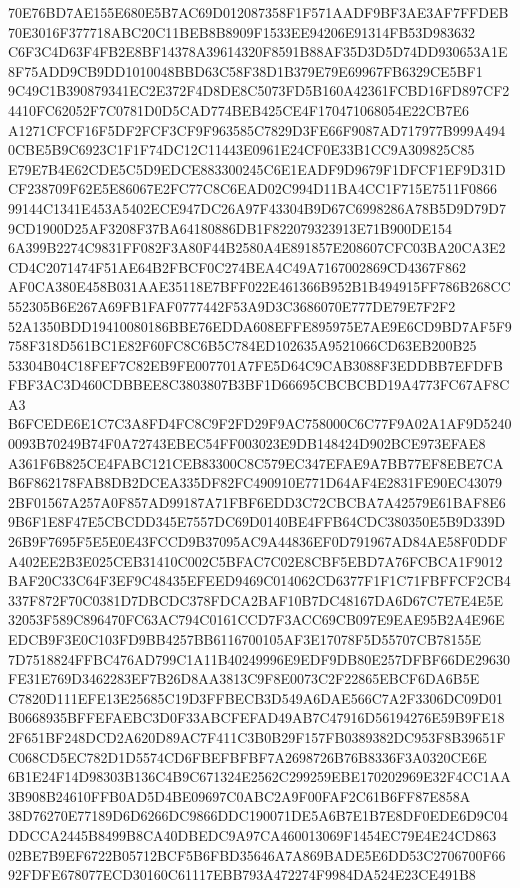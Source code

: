 \documentclass[UTF8,fontset=fandol,zihao=-4,a4paper]{ctexart}
\begin{document}
{{70E76BD7AE155E680E5B7AC69D012087358F1F571AADF9BF3AE3AF7FFDEB70E3016F377718ABC20C11BEB8B8909F1533EE94206E91314FB53D983632
C6F3C4D63F4FB2E8BF14378A39614320F8591B88AF35D3D5D74DD930653A1E8F75ADD9CB9DD1010048BBD63C58F38D1B379E79E69967FB6329CE5BF1
9C49C1B390879341EC2E372F4D8DE8C5073FD5B160A42361FCBD16FD897CF24410FC62052F7C0781D0D5CAD774BEB425CE4F170471068054E22CB7E6
A1271CFCF16F5DF2FCF3CF9F963585C7829D3FE66F9087AD717977B999A4940CBE5B9C6923C1F1F74DC12C11443E0961E24CF0E33B1CC9A309825C85
E79E7B4E62CDE5C5D9EDCE883300245C6E1EADF9D9679F1DFCF1EF9D31DCF238709F62E5E86067E2FC77C8C6EAD02C994D11BA4CC1F715E7511F0866
99144C1341E453A5402ECE947DC26A97F43304B9D67C6998286A78B5D9D79D79CD1900D25AF3208F37BA64180886DB1F822079323913E71B900DE154
6A399B2274C9831FF082F3A80F44B2580A4E891857E208607CFC03BA20CA3E2CD4C2071474F51AE64B2FBCF0C274BEA4C49A7167002869CD4367F862
AF0CA380E458B031AAE35118E7BFF022E461366B952B1B494915FF786B268CC552305B6E267A69FB1FAF0777442F53A9D3C3686070E777DE79E7F2F2
52A1350BDD19410080186BBE76EDDA608EFFE895975E7AE9E6CD9BD7AF5F9758F318D561BC1E82F60FC8C6B5C784ED102635A9521066CD63EB200B25
53304B04C18FEF7C82EB9FE007701A7FE5D64C9CAB3088F3EDDBB7EFDFBFBF3AC3D460CDBBEE8C3803807B3BF1D66695CBCBCBD19A4773FC67AF8CA3
B6FCEDE6E1C7C3A8FD4FC8C9F2FD29F9AC758000C6C77F9A02A1AF9D52400093B70249B74F0A72743EBEC54FF003023E9DB148424D902BCE973EFAE8
A361F6B825CE4FABC121CEB83300C8C579EC347EFAE9A7BB77EF8EBE7CAB6F862178FAB8DB2DCEA335DF82FC490910E771D64AF4E2831FE90EC43079
2BF01567A257A0F857AD99187A71FBF6EDD3C72CBCBA7A42579E61BAF8E69B6F1E8F47E5CBCDD345E7557DC69D0140BE4FFB64CDC380350E5B9D339D
26B9F7695F5E5E0E43FCCD9B37095AC9A44836EF0D791967AD84AE58F0DDFA402EE2B3E025CEB31410C002C5BFAC7C02E8CBF5EBD7A76FCBCA1F9012
BAF20C33C64F3EF9C48435EFEED9469C014062CD6377F1F1C71FBFFCF2CB4337F872F70C0381D7DBCDC378FDCA2BAF10B7DC48167DA6D67C7E7E4E5E
32053F589C896470FC63AC794C0161CCD7F3ACC69CB097E9EAE95B2A4E96EEDCB9F3E0C103FD9BB4257BB6116700105AF3E17078F5D55707CB78155E
7D7518824FFBC476AD799C1A11B40249996E9EDF9DB80E257DFBF66DE29630FE31E769D3462283EF7B26D8AA3813C9F8E0073C2F22865EBCF6DA6B5E
C7820D111EFE13E25685C19D3FFBECB3D549A6DAE566C7A2F3306DC09D01B0668935BFFEFAEBC3D0F33ABCFEFAD49AB7C47916D56194276E59B9FE18
2F651BF248DCD2A620D89AC7F411C3B0B29F157FB0389382DC953F8B39651FC068CD5EC782D1D5574CD6FBEFBFBF7A2698726B76B8336F3A0320CE6E
6B1E24F14D98303B136C4B9C671324E2562C299259EBE170202969E32F4CC1AA3B908B24610FFB0AD5D4BE09697C0ABC2A9F00FAF2C61B6FF87E858A
38D76270E77189D6D6266DC9866DDC190071DE5A6B7E1B7E8DF0EDE6D9C04DDCCA2445B8499B8CA40DBEDC9A97CA460013069F1454EC79E4E24CD863
02BE7B9EF6722B05712BCF5B6FBD35646A7A869BADE5E6DD53C2706700F6692FDFE678077ECD30160C61117EBB793A472274F9984DA524E23CE491B8
}}
\end{document}
